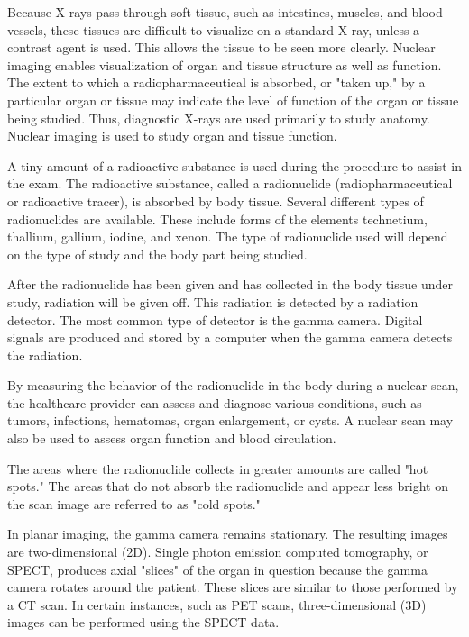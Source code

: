 \documentclass[12pt]{article}
\begin{document}
\noindent Because X-rays pass through soft tissue, such as intestines, muscles, and blood vessels, these tissues are difficult to visualize on a standard X-ray, unless a contrast agent is used. This allows the tissue to be seen more clearly. Nuclear imaging enables visualization of organ and tissue structure as well as function. The extent to which a radiopharmaceutical is absorbed, or "taken up," by a particular organ or tissue may indicate the level of function of the organ or tissue being studied. Thus, diagnostic X-rays are used primarily to study anatomy. Nuclear imaging is used to study organ and tissue function.

\noindent A tiny amount of a radioactive substance is used during the procedure to assist in the exam. The radioactive substance, called a radionuclide (radiopharmaceutical or radioactive tracer), is absorbed by body tissue. Several different types of radionuclides are available. These include forms of the elements technetium, thallium, gallium, iodine, and xenon. The type of radionuclide used will depend on the type of study and the body part being studied.

\noindent After the radionuclide has been given and has collected in the body tissue under study, radiation will be given off. This radiation is detected by a radiation detector. The most common type of detector is the gamma camera. Digital signals are produced and stored by a computer when the gamma camera detects the radiation.

\noindent By measuring the behavior of the radionuclide in the body during a nuclear scan, the healthcare provider can assess and diagnose various conditions, such as tumors, infections, hematomas, organ enlargement, or cysts. A nuclear scan may also be used to assess organ function and blood circulation.

\noindent The areas where the radionuclide collects in greater amounts are called "hot spots." The areas that do not absorb the radionuclide and appear less bright on the scan image are referred to as "cold spots."

\noindent In planar imaging, the gamma camera remains stationary. The resulting images are two-dimensional (2D). Single photon emission computed tomography, or SPECT, produces axial "slices" of the organ in question because the gamma camera rotates around the patient. These slices are similar to those performed by a CT scan. In certain instances, such as PET scans, three-dimensional (3D) images can be performed using the SPECT data.\\
\end{document}
